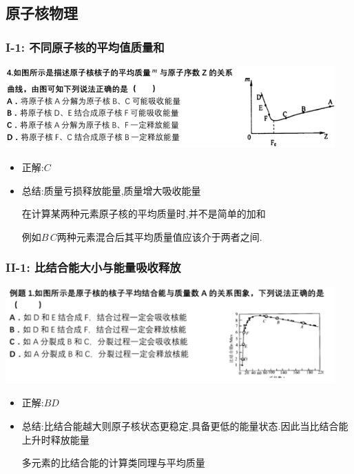 \documentclass{article}
\begin{document}
\vspace{2em}

\subsection{原子核物理}
\subsubsection{I-1: 不同原子核的平均值质量和}
\includegraphics[width = 0.95\textwidth,keepaspectratio]{./pictures/2.2-1.png}

\begin{itemize}
    \item 正解:\quad $C$
    \item 总结:\quad 质量亏损释放能量,质量增大吸收能量

          \hspace{3.3em}在计算某两种元素原子核的平均质量时,并不是简单的加和

          \hspace{3.3em}例如$B \, C$两种元素混合后其平均质量值应该介于两者之间.
\end{itemize}

\vspace{2em}

\subsubsection{II-1: 比结合能大小与能量吸收释放}
\includegraphics[width = 0.95\textwidth,keepaspectratio]{./pictures/2.2-2.png}

\begin{itemize}
    \item 正解:\quad $BD$
    \item 总结:\quad 比结合能越大则原子核状态更稳定,具备更低的能量状态.因此当比结合能上升时释放能量

          \hspace{3.3em}多元素的比结合能的计算类同理与平均质量
\end{itemize}
\end{document}
